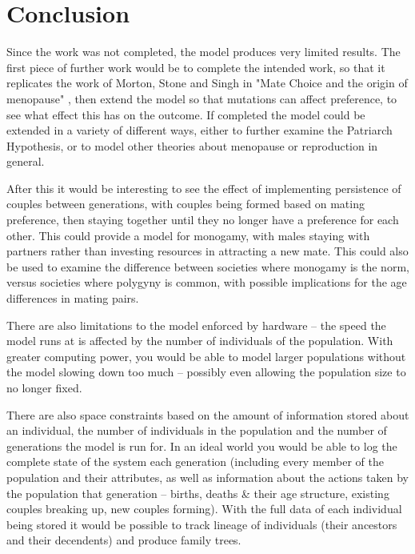 \documentclass[authoryearcitations]{UoYCSproject}
\begin{document}
\chapter{Conclusion}
\label{cha:Conclusion}
Since the work was not completed, the model produces very limited results. The first piece of further work would be to complete the intended work, so that it replicates the work of Morton, Stone and Singh in "Mate Choice and the origin of menopause" \cite{mateChoice2013}, then extend the model so that mutations can affect preference, to see what effect this has on the outcome. If completed the model could be extended in a variety of different ways, either to further examine the Patriarch Hypothesis, or to model other theories about menopause or reproduction in general.

After this it would be interesting to see the effect of implementing persistence of couples between generations, with couples being formed based on mating preference, then staying together until they no longer have a preference for each other. This could provide a model for monogamy, with males staying with partners rather than investing resources in attracting a new mate. This could also be used to examine the difference between societies where monogamy is the norm, versus societies where polygyny is common, with possible implications for the age differences in mating pairs.

There are also limitations to the model enforced by hardware -- the speed the model runs at is affected by the number of individuals of the population. With greater computing power, you would be able to model larger populations without the model slowing down too much -- possibly even allowing the population size to no longer fixed. 

There are also space constraints based on the amount of information stored about an individual, the number of individuals in the population and the number of generations the model is run for. In an ideal world you would be able to log the complete state of the system each generation (including every member of the population and their attributes, as well as information about the actions taken by the population that generation -- births, deaths \& their age structure, existing couples breaking up, new couples forming). With the full data of each individual being stored it would be possible to track lineage of individuals (their ancestors and their decendents) and produce family trees. 
\end{document}
